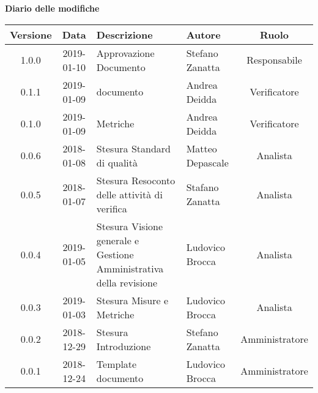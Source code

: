 	\begin{center}
		\textbf{Diario delle modifiche}
	\end{center}
	\begin{center}
		\begin{tabularx}{\textwidth}{|c|c|X|X|c|}
			\hline
			\textbf{Versione} & \textbf{Data} & \textbf{Descrizione} & \textbf{Autore} & \textbf{Ruolo} \\
			\hline
			1.0.0 & 2019-01-10 & Approvazione Documento& Stefano Zanatta & Responsabile\\
			\hline
			0.1.1 & 2019-01-09 & \glossario{Verifica} documento & Andrea Deidda & Verificatore\\
			\hline
			0.1.0 & 2019-01-09 & \glossario{Verifica} Metriche & Andrea Deidda & Verificatore\\
			\hline
			0.0.6 & 2018-01-08 & Stesura Standard di qualità & Matteo Depascale & Analista\\
			\hline
			0.0.5 & 2018-01-07 & Stesura Resoconto delle attività di verifica & Stafano Zanatta & Analista\\
			\hline
			0.0.4 & 2019-01-05 & Stesura Visione generale e Gestione Amministrativa della revisione  & Ludovico Brocca& Analista\\
			\hline	
			0.0.3 & 2019-01-03& Stesura Misure e Metriche &Ludovico Brocca & Analista\\
			\hline
			0.0.2 & 2018-12-29 & Stesura Introduzione& Stefano Zanatta & Amministratore\\
			\hline
			0.0.1 & 2018-12-24 & Template documento & Ludovico Brocca & Amministratore\\
			\hline
		\end{tabularx}
	\end{center}
\newpage